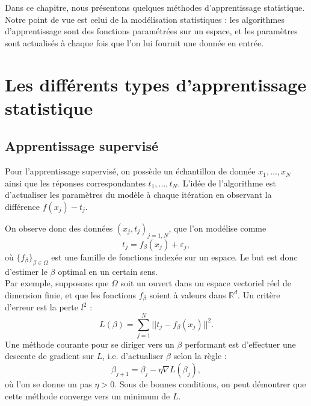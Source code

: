 Dans ce chapitre, nous présentons quelques méthodes d'apprentissage statistique. Notre point de vue est celui de la modélisation statistiques : les algorithmes d'apprentissage sont des fonctions paramétrées sur un espace, et les paramètres sont actualisés à chaque fois que l'on lui fournit une donnée en entrée.

\section{Les différents types d'apprentissage statistique}

\subsection{Apprentissage supervisé}

Pour l'apprentissage supervisé, on possède un échantillon de donnée $x_1,...,x_N$ ainsi que les réponses correspondantes $t_1,...,t_N$. L'idée de l'algorithme est d'actualiser les paramètres du modèle à chaque itération en observant la différence $f(x_j)-t_j$. 

On observe donc des données $(x_j,t_j)_{j=1,N}$, que l'on modélise comme 
\[t_j = f_\beta (x_j) +\varepsilon_j,\]
où $\{f_\beta\}_{\beta\in\Omega}$ est une famille de fonctions indexée sur un espace. Le but est donc d'estimer le $\beta$ optimal en un certain sens.\\
 
Par exemple, supposons que $\Omega$ soit un ouvert dans un espace vectoriel réel de dimension finie, et que les fonctions $f_\beta$ soient à valeurs dans $\mathbb R^d$. Un critère d'erreur est la perte $ l^2$ :
\[L(\beta)= \sum_{j=1}^N ||t_j-f_\beta(x_j)||^2.\]
Une méthode courante pour se diriger vers un $\beta$ performant est d'effectuer une descente de gradient sur $L$, i.e. d'actualiser $\beta$ selon la règle :
\[\beta_{j+1} = \beta_j -\eta \nabla L(\beta_j),\]
où l'on se donne un pas $\eta>0$. Sous de bonnes conditions, on peut démontrer que cette méthode converge vers un minimum de $L$.